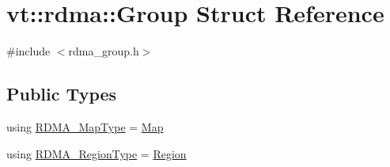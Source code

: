 \hypertarget{structvt_1_1rdma_1_1_group}{}\section{vt\+:\+:rdma\+:\+:Group Struct Reference}
\label{structvt_1_1rdma_1_1_group}


{\ttfamily \#include $<$rdma\+\_\+group.\+h$>$}

\subsection*{Public Types}
\begin{DoxyCompactItemize}
\item 
using \hyperlink{structvt_1_1rdma_1_1_group_a6a953be1b6d9907d49364a9a202d3379}{R\+D\+M\+A\+\_\+\+Map\+Type} = \hyperlink{structvt_1_1rdma_1_1_map}{Map}
\item 
using \hyperlink{structvt_1_1rdma_1_1_group_a245644a7a0c40c547728a74e69c5e02f}{R\+D\+M\+A\+\_\+\+Region\+Type} = \hyperlink{structvt_1_1rdma_1_1_region}{Region}
\end{DoxyCompactItemize}
